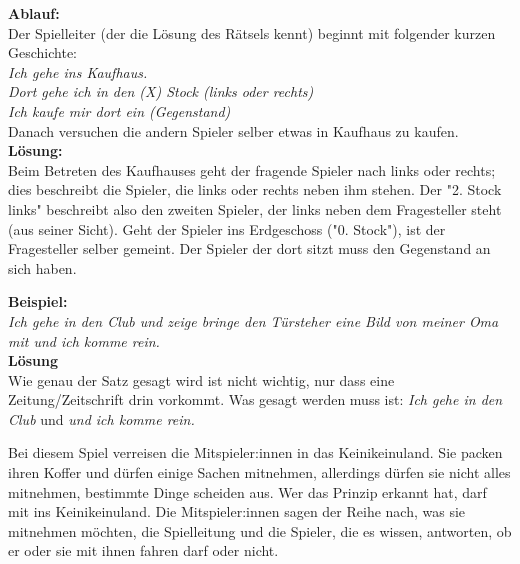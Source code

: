 \textbf{Ablauf:}\\
Der Spielleiter (der die Lösung des Rätsels kennt) beginnt mit folgender kurzen Geschichte:\\
\textit{Ich gehe ins Kaufhaus.}\\
\textit{Dort gehe ich in den (X) Stock (links oder rechts)}\\
\textit{Ich kaufe mir dort ein (Gegenstand)}\\ 
Danach versuchen die andern Spieler selber etwas in Kaufhaus zu kaufen.\\
\newline
\textbf{Lösung:}\\
Beim Betreten des Kaufhauses geht der fragende Spieler nach links oder rechts; dies beschreibt die Spieler, die links oder rechts neben ihm stehen. Der "2. Stock links" beschreibt also den zweiten Spieler, der links neben dem Fragesteller steht (aus seiner Sicht). Geht der Spieler ins Erdgeschoss ("0. Stock"), ist der Fragesteller selber gemeint. Der Spieler der dort sitzt muss den Gegenstand an sich haben.

\textbf{Beispiel:}\\

\textit{Ich gehe in den Club und zeige bringe den Türsteher eine Bild von meiner Oma mit und ich komme rein.}\\
\textbf{Lösung}\\
Wie genau der Satz gesagt wird ist nicht wichtig, nur dass eine Zeitung/Zeitschrift drin vorkommt. Was gesagt werden muss ist: \textit{Ich gehe in den Club} und \textit{und ich komme rein.}

Bei diesem Spiel verreisen die Mitspieler:innen in das Keinikeinuland.
Sie packen ihren Koffer und dürfen einige Sachen mitnehmen, allerdings dürfen sie nicht alles mitnehmen, bestimmte Dinge scheiden aus.
Wer das Prinzip erkannt hat, darf mit ins Keinikeinuland.
Die Mitspieler:innen sagen der Reihe nach, was sie mitnehmen möchten, die Spielleitung und die Spieler, die es wissen, antworten, ob er oder sie mit ihnen fahren darf oder nicht.


